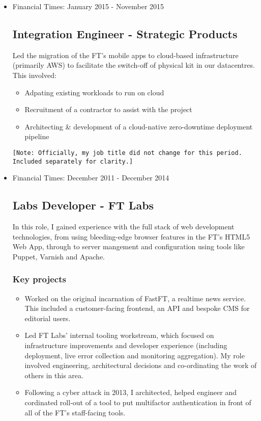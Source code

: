 \documentclass[a4paper]{article}
\begin{document}
\begin{itemize}
\item Financial Times: January 2015 - November 2015
\subsection*{Integration Engineer - Strategic Products}
Led the migration of the FT's mobile apps to cloud-based infrastructure (primarily AWS) to facilitate the switch-off of physical kit in our datacentres.  This involved:
\begin{itemize}
\item Adpating existing workloads to run on cloud
\item Recruitment of a contractor to assist with the project
\item Architecting \& development of a cloud-native zero-downtime deployment pipeline
\end{itemize}

\small{\texttt{[Note: Officially, my job title did not change for this period. Included separately for clarity.]}}

\item Financial Times: December 2011 - December 2014
\subsection*{Labs Developer - FT Labs}
In this role, I gained experience with the full stack of web development technologies, from using bleeding-edge browser features in the FT's HTML5 Web App, through to server mangement and configuration using tools like Puppet, Varnish and Apache.

\subsubsection*{Key projects}
\begin{itemize}
\item Worked on the original incarnation of FastFT, a realtime news service.  This included a customer-facing frontend, an API and bespoke CMS for editorial users.

\item Led FT Labs' internal tooling workstream, which focused on infrastructure improvements and developer experience (including deployment, live error collection and monitoring aggregation).  My role involved engineering, architectural decisions and co-ordinating the work of others in this area.

\item Following a cyber attack in 2013, I architected, helped engineer and cordinated roll-out of a tool to put multifactor authentication in front of all of the FT's staff-facing tools.
\end{itemize}



\end{itemize}
\end{document}
